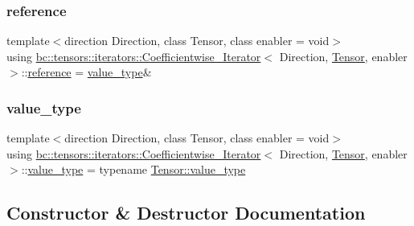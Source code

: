 \subsubsection{\texorpdfstring{reference}{reference}}
{\footnotesize\ttfamily template$<$direction Direction, class Tensor, class enabler = void$>$ \\
using \hyperlink{structbc_1_1tensors_1_1iterators_1_1Coefficientwise__Iterator}{bc\+::tensors\+::iterators\+::\+Coefficientwise\+\_\+\+Iterator}$<$ Direction, \hyperlink{namespacebc_a659391e47ab612be3ba6c18cf9c89159}{Tensor}, enabler $>$\+::\hyperlink{structbc_1_1tensors_1_1iterators_1_1Coefficientwise__Iterator_a03f4d14739b564e4052b6f6de3fd7749}{reference} =  \hyperlink{structbc_1_1tensors_1_1iterators_1_1Coefficientwise__Iterator_a84e737fc2a829453cf0c7bb5997a487a}{value\+\_\+type}\&}

\mbox{\label{structbc_1_1tensors_1_1iterators_1_1Coefficientwise__Iterator_a84e737fc2a829453cf0c7bb5997a487a}} 
\subsubsection{\texorpdfstring{value\+\_\+type}{value\_type}}
{\footnotesize\ttfamily template$<$direction Direction, class Tensor, class enabler = void$>$ \\
using \hyperlink{structbc_1_1tensors_1_1iterators_1_1Coefficientwise__Iterator}{bc\+::tensors\+::iterators\+::\+Coefficientwise\+\_\+\+Iterator}$<$ Direction, \hyperlink{namespacebc_a659391e47ab612be3ba6c18cf9c89159}{Tensor}, enabler $>$\+::\hyperlink{structbc_1_1tensors_1_1iterators_1_1Coefficientwise__Iterator_a84e737fc2a829453cf0c7bb5997a487a}{value\+\_\+type} =  typename \hyperlink{classbc_1_1tensors_1_1Tensor__Base_ae7e5c0119f62f43ef74c5a463d3eaf13}{Tensor\+::value\+\_\+type}}



\subsection{Constructor \& Destructor Documentation}
\mbox{\label{structbc_1_1tensors_1_1iterators_1_1Coefficientwise__Iterator_ab65b21459892c1371d3b48c822d4d4f2}} 
